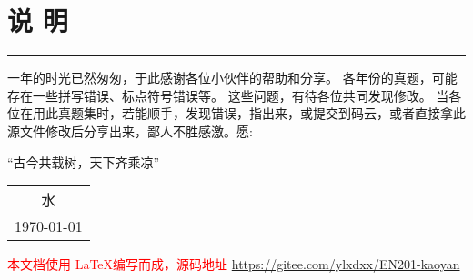 




\chapter*{说 \quad 明}
\thispagestyle{empty}




\rule{2em}{0pt}一年的时光已然匆匆，于此感谢各位小伙伴的帮助和分享。
各年份的真题，可能存在一些拼写错误、标点符号错误等。
这些问题，有待各位共同发现修改。
当各位在用此真题集时，若能顺手，发现错误，指出来，或提交到码云，或者直接拿此源文件修改后分享出来，鄙人不胜感激。愿:
\begin{center}
	\kaishu 
	“古今共载树，天下齐乘凉”
\end{center}
\begin{center}
	\flushright
	\begin{tabular}{c}
		水   \\
		\today
	\end{tabular}	
\end{center}

\vfil
\noindent
\textcolor{red}{本文档使用 \LaTeX 编写而成，源码地址 \url{https://gitee.com/ylxdxx/EN201-kaoyan}  }
\vfil



